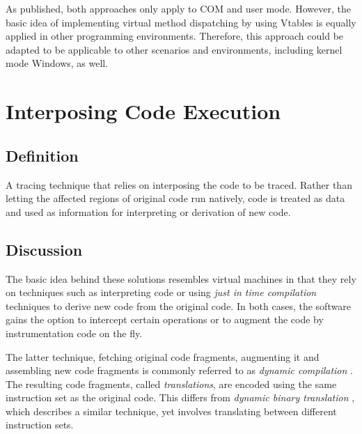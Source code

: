 As published, both approaches only apply to COM and user mode. However, the basic idea of 
implementing virtual method dispatching by using Vtables is equally applied in other 
programming environments. Therefore, this approach could be adapted to be applicable to
other scenarios and environments, including kernel mode Windows, as well. 

%

\section{Interposing Code Execution}
\subsection*{Definition}
A tracing technique that relies on interposing the code to be traced. Rather than 
letting the affected regions of original code run natively, code is treated 
as data and used as information for interpreting or derivation of new code.

\subsection*{Discussion}
The basic idea behind these solutions resembles virtual machines in that
they rely on techniques such as interpreting code or using \emph{just in time compilation} 
techniques to derive new code from the original code. In 
both cases, the software gains the option to intercept certain operations or
to augment the code by instrumentation code on the fly. 

The latter technique, fetching original code fragments, augmenting it and assembling new code 
fragments is commonly referred to as \emph{dynamic compilation} \cite{cmelik94shade}. 
The resulting code fragments, called \emph{translations}, are encoded using the same instruction
set as the original code. This differs from \emph{dynamic binary translation} \cite{cifuentesbinary},
which describes a similar technique, yet involves translating between different instruction 
sets. 


